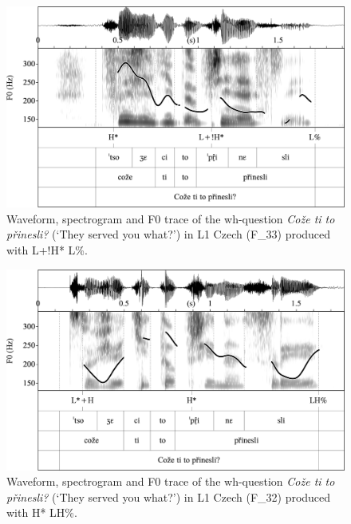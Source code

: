 \begin{figure}


\includegraphics[width=\textwidth]{figures/Figure_4.111.png}



\caption{Waveform, spectrogram and F0 trace of the wh-question \textit{Cože ti to přinesli?} (‘They served you what?’) in L1 Czech (F\_33) produced with L+!H* L\%.}
\label{fig:4.111}
\end{figure}


\begin{figure}


\includegraphics[width=\textwidth]{figures/Figure_4.112.png}


\caption{Waveform, spectrogram and F0 trace of the wh-question \textit{Cože ti to přinesli?} (‘They served you what?’) in L1 Czech (F\_32) produced with H* LH\%.}
\label{fig:4.112}
\end{figure}


